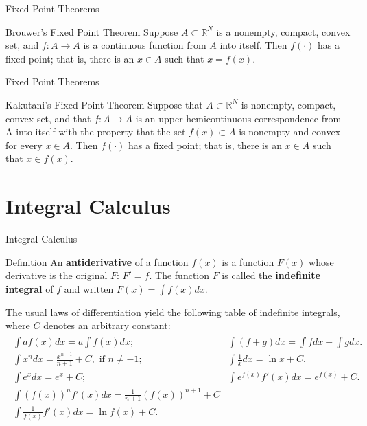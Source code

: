 \documentclass{beamer}
\begin{document}
\begin{frame}{Fixed Point Theorems}
\begin{block}{Brouwer's Fixed Point Theorem}
Suppose $A\subset \mathbb{R}^N$ is a nonempty, compact, convex set, and $f:A\to A$ is a continuous function from $A$ into itself. Then $f(\cdot )$ has a fixed point; that is, there is an $x\in A$ such that $x=f(x)$.

\end{block}

\end{frame}

\begin{frame}{Fixed Point Theorems}
\begin{block}{Kakutani's Fixed Point Theorem}
Suppose that $A\subset \mathbb{R}^N$ is nonempty, compact, convex set, and that $f:A\to A$ is an upper hemicontinuous correspondence from A into itself with the property that the set $f(x) \subset A$ is nonempty and convex for every $x\in A$. Then $f(\cdot )$ has a fixed point; that is, there is an $x\in A$ such that $x\in f(x)$.

\end{block}
\end{frame}
\section{Integral Calculus}
\begin{frame}{Integral Calculus}
    \begin{block}{Definition}
    An \textbf{antiderivative} of a function $f(x)$ is a function $F(x)$ whose derivative is the original $F$: $F'=f$. The function $F$ is called the \textbf{indefinite integral} of $f$ and written $F(x)=\int f(x)dx.$
    \end{block}
    The usual laws of differentiation yield the following table of indefinite integrals, where $C$ denotes an arbitrary constant:
    \begin{align*}
        \begin{array}{lr}
            \int af(x)dx=a \int f(x)dx; & \int (f+g)dx=\int fdx +\int gdx.  \\
          \int x^n dx=\frac{x^{n+1}}{n+1}+C, \text{ if }n\neq -1;   & \int \frac{1}{x}dx=\ln x+C. \\
          \int e^xdx=e^x+C; & \int e^{f(x)}f'(x)dx=e^{f(x)}+C.\\
          \int \left(f(x)\right)^nf'(x)dx=\frac{1}{n+1}\left(f(x)\right)^{n+1}+C & \\
          \int \frac{1}{f(x)}f'(x)dx=\ln f(x)+C. &
        \end{array}
    \end{align*}
\end{frame}
\end{document}
